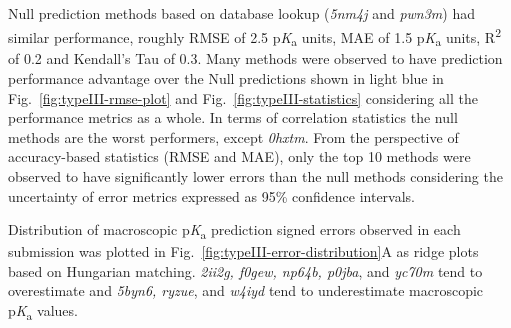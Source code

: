\documentclass[9pt,lineno,final]{elife}
\newcommand{\pKa}{p\textit{K}\textsubscript{a}}
\begin{document}
Null prediction methods based on database lookup (\textit{5nm4j} and \textit{pwn3m}) had similar performance, roughly RMSE of 2.5 \pKa{} units, MAE of 1.5 \pKa{} units, R\textsuperscript{2} of 0.2 and Kendall's Tau of 0.3.
Many methods were observed to have prediction performance advantage over the Null predictions shown in light blue in Fig.~\ref{fig:typeIII-rmse-plot} and Fig.~\ref{fig:typeIII-statistics} considering all the performance metrics as a whole.
In terms of correlation statistics the null methods are the worst performers, except \textit{0hxtm}.
From the perspective of accuracy-based statistics (RMSE and MAE), only the top 10 methods were observed to have significantly lower errors than the null methods considering the uncertainty of error metrics expressed as 95\% confidence intervals.

Distribution of macroscopic \pKa{} prediction signed errors observed in each submission was plotted in Fig.~\ref{fig:typeIII-error-distribution}A as ridge plots based on Hungarian matching.
\textit{2ii2g, f0gew, np64b, p0jba}, and \textit{yc70m} tend to overestimate and \textit{
5byn6, ryzue}, and \textit{w4iyd} tend to underestimate macroscopic \pKa{} values. 
\end{document}
